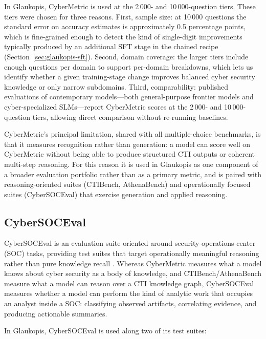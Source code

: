 \documentclass[unnumsec,webpdf,contemporary,large]{oup-authoring-template}
\theoremstyle{thmstyleone}
\theoremstyle{thmstyletwo}
\theoremstyle{thmstylethree}
\begin{document}
In Glaukopis, CyberMetric is used at the 2\,000- and 10\,000-question tiers. These tiers were chosen for three reasons. First, sample size: at 10\,000 questions the standard error on accuracy estimates is approximately 0.5 percentage points, which is fine-grained enough to detect the kind of single-digit improvements typically produced by an additional SFT stage in the chained recipe (Section~\ref{sec:glaukopis-sft}). Second, domain coverage: the larger tiers include enough questions per domain to support per-domain breakdowns, which lets us identify whether a given training-stage change improves balanced cyber security knowledge or only narrow subdomains. Third, comparability: published evaluations of contemporary models---both general-purpose frontier models and cyber-specialized SLMs---report CyberMetric scores at the 2\,000- and 10\,000-question tiers, allowing direct comparison without re-running baselines.

CyberMetric's principal limitation, shared with all multiple-choice benchmarks, is that it measures recognition rather than generation: a model can score well on CyberMetric without being able to produce structured CTI outputs or coherent multi-step reasoning. For this reason it is used in Glaukopis as one component of a broader evaluation portfolio rather than as a primary metric, and is paired with reasoning-oriented suites (CTIBench, AthenaBench) and operationally focused suites (CyberSOCEval) that exercise generation and applied reasoning.

\subsection{CyberSOCEval}
\label{sec:cybersoceval}

CyberSOCEval is an evaluation suite oriented around security-operations-center (SOC) tasks, providing test suites that target operationally meaningful reasoning rather than pure knowledge recall \cite{cybersoceval2025}. Whereas CyberMetric measures what a model knows about cyber security as a body of knowledge, and CTIBench/AthenaBench measure what a model can reason over a CTI knowledge graph, CyberSOCEval measures whether a model can perform the kind of analytic work that occupies an analyst inside a SOC: classifying observed artifacts, correlating evidence, and producing actionable summaries.

In Glaukopis, CyberSOCEval is used along two of its test suites:
\end{document}
